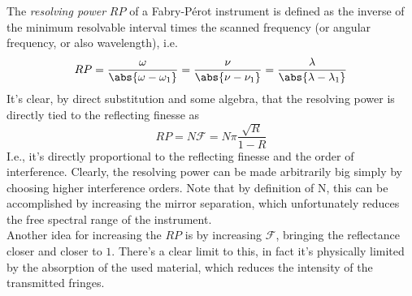 \documentclass[../electromagnetism.tex]{subfiles}
\begin{document}
\begin{dfn}
	The \emph{resolving power} $RP$ of a Fabry-Pérot instrument is defined as the inverse of the minimum resolvable interval times the scanned frequency (or angular frequency, or also wavelength), i.e.
	\begin{equation}
		RP=\frac{\omega}{\abs{\omega-\omega_1}}=\frac{\nu}{\abs{\nu-\nu_1}}=\frac{\lambda}{\abs{\lambda-\lambda_1}}
		\label{eq:resolvingpowerfpi}
	\end{equation}
	It's clear, by direct substitution and some algebra, that the resolving power is directly tied to the reflecting finesse as
	\begin{equation}
		RP=N\mathcal{F}=N\pi\frac{\sqrt{R}}{1-R}
		\label{eq:rpfcrossover}
	\end{equation}
	I.e., it's directly proportional to the reflecting finesse and the order of interference. Clearly, the resolving power can be made arbitrarily big simply by choosing higher interference orders. Note that by definition of N, this can be accomplished by increasing the mirror separation, which unfortunately reduces the free spectral range of the instrument.\\
	Another idea for increasing the $RP$ is by increasing $\mathcal{F}$, bringing the reflectance closer and closer to $1$. There's a clear limit to this, in fact it's physically limited by the absorption of the used material, which reduces the intensity of the transmitted fringes.
\end{dfn}
\end{document}
